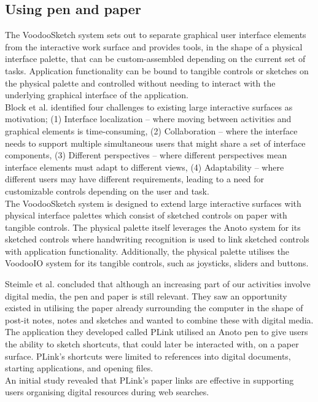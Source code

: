 \subsection{Using pen and paper} %
\label{sub:using_pen_and_paper}
The VoodooSketch system sets out to separate graphical user interface elements from the  interactive work surface and provides tools, in the shape of a physical interface palette, that can be custom-assembled depending on the current set of tasks. Application functionality can be bound to tangible controls or sketches on the physical palette and controlled without needing to interact with the underlying graphical interface of the application. \\
Block et al. identified four challenges to existing large interactive surfaces as motivation; (1) Interface localization -- where moving between activities and graphical elements is time-consuming, (2) Collaboration -- where the interface needs to support multiple simultaneous users that might share a set of interface components, (3) Different perspectives -- where different perspectives mean interface elements must adapt to different views, (4) Adaptability -- where different users may have different requirements, leading to a need for customizable controls depending on the user and task. \\
The VoodooSketch system\cite{Block:2008:VEI:1347390.1347404} is designed to extend large interactive surfaces with physical interface palettes which consist of sketched controls on paper with tangible controls. The physical palette itself leverages the Anoto\cite{anoto2011anoto} system for its sketched controls where handwriting recognition is used to link sketched controls with application functionality. Additionally, the physical palette utilises the VoodooIO\cite{villar2007voodooio} system for its tangible controls, such as joysticks, sliders and buttons.


Steimle et al. concluded that although an increasing part of our activities involve digital media, the pen and paper is still relevant. They saw an opportunity existed in utilising the paper already surrounding the computer in the shape of post-it notes, notes and sketches and wanted to combine these with digital media. The application they developed called PLink \cite{steimle2011plink} utilised an Anoto pen to give users the ability to sketch shortcuts, that could later be interacted with,  on a paper surface. PLink’s shortcuts were limited to references into digital documents, starting applications, and opening files. \\
An initial study revealed that PLink's paper links are effective in supporting users organising digital resources during web searches.


